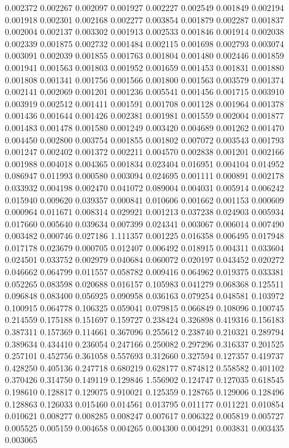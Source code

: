 0.002372
0.002267
0.002097
0.001927
0.002227
0.002549
0.001849
0.002194
0.001918
0.002301
0.002168
0.002277
0.003854
0.001879
0.002287
0.001837
0.002004
0.002137
0.003302
0.001913
0.002533
0.001846
0.001914
0.002038
0.002339
0.001875
0.002732
0.001484
0.002115
0.001698
0.002793
0.003074
0.003091
0.002039
0.001855
0.001763
0.001804
0.001480
0.002446
0.001859
0.001941
0.001563
0.001803
0.001952
0.001659
0.001453
0.001831
0.001880
0.001808
0.001341
0.001756
0.001566
0.001800
0.001563
0.003579
0.001374
0.002141
0.002069
0.001201
0.001236
0.005541
0.001456
0.001715
0.003910
0.003919
0.002512
0.001411
0.001591
0.001708
0.001128
0.001964
0.001378
0.001436
0.001644
0.001426
0.002381
0.001981
0.001559
0.002004
0.001877
0.001483
0.001478
0.001580
0.001249
0.003420
0.004689
0.001262
0.001470
0.004450
0.002800
0.003754
0.001855
0.001802
0.007072
0.003543
0.001793
0.001247
0.002402
0.001372
0.002211
0.004570
0.002838
0.001201
0.002166
0.001988
0.004018
0.004365
0.001834
0.023404
0.016951
0.004104
0.014952
0.086947
0.011993
0.000580
0.003094
0.024695
0.001111
0.000891
0.002178
0.033932
0.004198
0.002470
0.041072
0.089004
0.004031
0.005914
0.006242
0.015940
0.009620
0.039357
0.000841
0.010606
0.001662
0.001153
0.000609
0.000964
0.011671
0.008314
0.029921
0.001213
0.037238
0.024903
0.005934
0.017660
0.005640
0.039634
0.007399
0.024341
0.003067
0.006014
0.007490
0.003482
0.000746
0.027186
1.111357
0.001225
0.016358
0.006495
0.017948
0.017178
0.023679
0.000705
0.012407
0.006492
0.018915
0.004311
0.033604
0.024501
0.033752
0.002979
0.040684
0.060072
0.020197
0.043452
0.020272
0.046662
0.064799
0.011557
0.058782
0.009416
0.064962
0.019375
0.033381
0.052265
0.083598
0.020688
0.016157
0.105983
0.041279
0.068368
0.125511
0.096848
0.083400
0.056925
0.090958
0.036163
0.079254
0.048581
0.103972
0.100915
0.064778
0.106325
0.059041
0.079815
0.066849
0.108096
0.100745
0.214559
0.175188
0.151697
0.159727
0.238424
0.326898
0.419316
0.156183
0.387311
0.157369
0.114661
0.367096
0.255612
0.238740
0.210321
0.289794
0.389634
0.434410
0.236054
0.247166
0.250082
0.297296
0.316337
0.201525
0.257101
0.452756
0.361058
0.557693
0.312660
0.327594
0.127357
0.419737
0.428250
0.405136
0.247718
0.680219
0.628177
0.874812
0.558582
0.401102
0.370426
0.314750
0.149119
0.129846
1.556902
0.124747
0.127035
0.618545
0.198610
0.128817
0.129075
0.910021
0.125359
0.128765
0.129006
0.128496
0.128863
0.126033
0.015460
0.014561
0.013795
0.011177
0.011221
0.010854
0.010621
0.008277
0.008285
0.008247
0.007617
0.006322
0.005819
0.005727
0.005525
0.005159
0.004658
0.004265
0.004300
0.004291
0.003831
0.003435
0.003065
